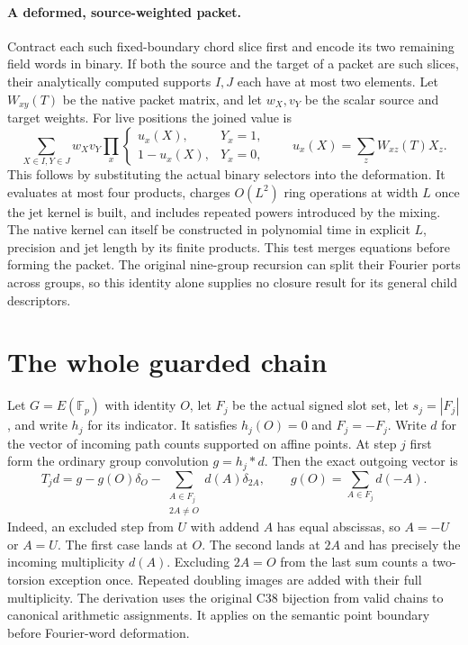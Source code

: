 \documentclass[11pt]{article}
\begin{document}
\paragraph{A deformed, source-weighted packet.}
Contract each such fixed-boundary chord slice first and encode its two
remaining field words in binary. If both the source and the target of
a packet are such slices, their analytically computed supports $I,J$
each have at most two elements. Let $W_{xy}(T)$ be the native packet
matrix, and let $w_X,v_Y$ be the scalar source and target weights.
For live positions the joined value is
\[
 \sum_{X\in I,Y\in J}w_Xv_Y
 \prod_x
 \begin{cases}
 u_x(X),&Y_x=1,\\
 1-u_x(X),&Y_x=0,
 \end{cases}
 \qquad u_x(X)=\sum_{z} W_{xz}(T)X_z .
\]
This follows by substituting the actual binary selectors into the
deformation. It evaluates at most four products, charges
$O(L^2)$ ring operations at width $L$ once the jet kernel is built, and
includes repeated powers introduced by the mixing. The native kernel
can itself be constructed in polynomial time in explicit $L$, precision
and jet length by its finite products. This test merges equations
before forming the packet. The original nine-group recursion can split
their Fourier ports across groups, so this identity alone supplies no
closure result for its general child descriptors.

\section{The whole guarded chain}
Let $G=E(\mathbb F_p)$ with identity $O$, let $F_j$ be the actual signed
slot set, let $s_j=|F_j|$, and write $h_j$ for its indicator.
It satisfies $h_j(O)=0$ and $F_j=-F_j$. Write $d$ for the vector of
incoming path counts supported on affine points. At step $j$ first form
the ordinary group convolution $g=h_j*d$. Then the exact outgoing
vector is
\begin{equation}
 T_j d=g-g(O)\delta_O-
 \sum_{\substack{A\in F_j\\2A\ne O}}d(A)\delta_{2A},
 \qquad g(O)=\sum_{A\in F_j} d(-A).
 \label{guard}
\end{equation}
Indeed, an excluded step from $U$ with addend $A$ has equal abscissas,
so $A=-U$ or $A=U$. The first case lands at $O$. The second lands at
$2A$ and has precisely the incoming multiplicity $d(A)$. Excluding
$2A=O$ from the last sum counts a two-torsion exception once.
Repeated doubling images are added with their full multiplicity.
The derivation uses the original C38 bijection from valid chains to
canonical arithmetic assignments. It applies on the semantic point
boundary before Fourier-word deformation.
\end{document}
